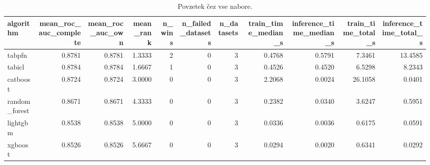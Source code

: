 \begin{table}[htbp]
\centering
\caption{Povzetek čez vse nabore.}
\label{tab:overall}
\begin{tabular}{lrrrrrrrrrr}
\hline
algorithm & mean\_roc\_auc\_complete & mean\_roc\_auc\_own & mean\_rank & n\_wins & n\_failed\_datasets & n\_datasets & train\_time\_median\_s & inference\_time\_median\_s & train\_time\_total\_s & inference\_time\_total\_s \\
\hline
tabpfn & 0.8781 & 0.8781 & 1.3333 & 2 & 0 & 3 & 0.4768 & 0.5791 & 7.3461 & 13.4585 \\
tabicl & 0.8784 & 0.8784 & 1.6667 & 1 & 0 & 3 & 0.4526 & 0.4520 & 6.5298 & 8.2343 \\
catboost & 0.8724 & 0.8724 & 3.0000 & 0 & 0 & 3 & 2.2068 & 0.0024 & 26.1058 & 0.0401 \\
random\_forest & 0.8671 & 0.8671 & 4.3333 & 0 & 0 & 3 & 0.2382 & 0.0340 & 3.6247 & 0.5951 \\
lightgbm & 0.8538 & 0.8538 & 5.0000 & 0 & 0 & 3 & 0.0336 & 0.0036 & 0.6175 & 0.0591 \\
xgboost & 0.8526 & 0.8526 & 5.6667 & 0 & 0 & 3 & 0.0294 & 0.0020 & 0.6341 & 0.0292 \\
\hline
\end{tabular}
\end{table}
